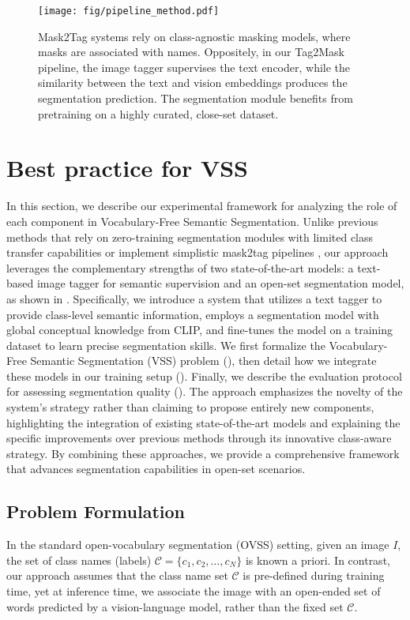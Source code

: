 \begin{figure*}[t]
    \centering
    \texttt{[image: fig/pipeline\_method.pdf]}
    \caption{Mask2Tag systems rely on class-agnostic masking models, where masks are associated with names. Oppositely, in our Tag2Mask pipeline, the image tagger supervises the text encoder, while the similarity between the text and vision embeddings produces the segmentation prediction. The segmentation module benefits from pretraining on a highly curated, close-set dataset.}
    \label{fig:method}
\end{figure*}

\section{Best practice for VSS}
\label{ch:method}
In this section, we describe our experimental framework for analyzing the role of each component in Vocabulary-Free Semantic Segmentation. %
Unlike previous methods that rely on zero-training segmentation modules with limited class transfer capabilities \cite{conti2024vocabulary} or implement simplistic mask2tag pipelines \cite{rewatbowornwong2023zero,kawano2024tag}, our approach leverages the complementary strengths of two state-of-the-art models: a text-based image tagger for semantic supervision and an open-set segmentation model, as shown in .
Specifically, we introduce a system that utilizes a text tagger to provide class-level semantic information, employs a segmentation model with global conceptual knowledge from CLIP, and fine-tunes the model on a training dataset to learn precise segmentation skills. We first formalize the Vocabulary-Free Semantic Segmentation (VSS) problem (), then detail how we integrate these models in our training setup (). Finally, we describe the evaluation protocol for assessing segmentation quality ().
The approach emphasizes the novelty of the system's strategy rather than claiming to propose entirely new components, highlighting the integration of existing state-of-the-art models and explaining the specific improvements over previous methods through its innovative class-aware strategy. By combining these approaches, we provide a comprehensive framework that advances segmentation capabilities in open-set scenarios.

\subsection{Problem Formulation}\label{sec:formulation}
In the standard open-vocabulary segmentation (OVSS) setting, given an image \( I \), the set of class names (labels) \( \mathcal{C} = \{c_1, c_2, \dots, c_N\} \) is known a priori. In contrast, our approach assumes that the class name set \( \mathcal{C} \) is pre-defined during training time, yet at inference time, we associate the image with an open-ended set of words predicted by a vision-language model, rather than the fixed set \( \mathcal{C} \).


